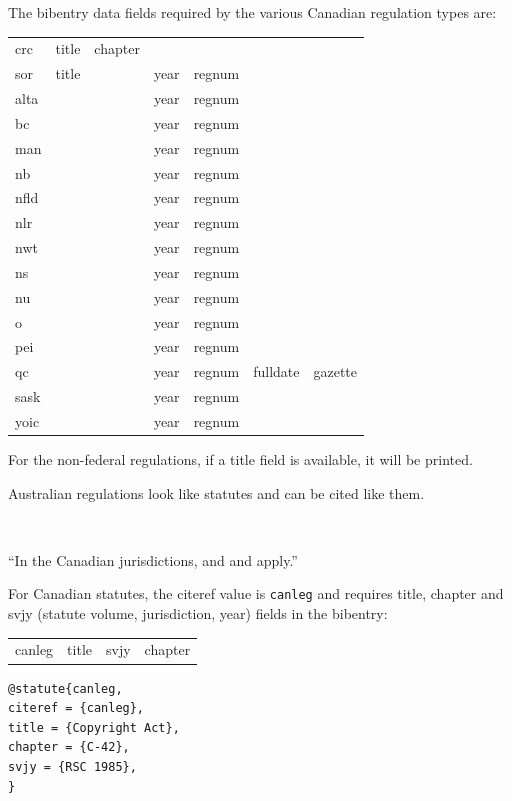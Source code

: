 The bibentry data fields required by the various Canadian regulation types are:
\bigskip

\begin{tabular}{lllllll}
crc & title & chapter &&&& \\
sor & title && year & regnum && \\
alta & && year & regnum && \\
bc &  && year & regnum && \\
man & && year & regnum && \\
nb &  && year & regnum && \\
nfld &  && year & regnum && \\
nlr &  && year & regnum && \\
nwt &  && year & regnum && \\
ns &  && year & regnum && \\
nu &  && year & regnum && \\
o &  && year & regnum && \\
pei &  && year & regnum && \\
qc &  && year & regnum & fulldate & gazette\\
sask &  && year & regnum && \\
yoic &  && year & regnum && \\
\end{tabular}

For the non-federal regulations, if a title field is available, it will be printed.
\bigskip

Australian regulations look like statutes and can be cited like them.
\bigskip

\hfill * \hfill\ 
\bigskip

``In the Canadian jurisdictions, 
 and 
 and
 apply.''
\bigskip

For Canadian statutes, the citeref value is \verb|canleg| and requires title, chapter and svjy (statute volume, jurisdiction, year) fields in the bibentry:
\bigskip

\begin{tabular}{llll}
canleg & title & svjy & chapter \\
\end{tabular}
\bigskip

\begin{verbatim}
@statute{canleg,
citeref = {canleg},
title = {Copyright Act},
chapter = {C-42},
svjy = {RSC 1985},
}
\end{verbatim}



